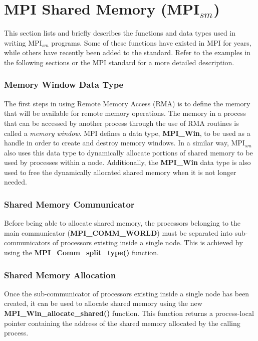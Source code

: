 \section{MPI Shared Memory (MPI$_{sm}$)}

This section lists and briefly describes the functions and data types used in writing MPI$_{sm}$ programs. Some of these functions have existed in MPI for years, while others have recently been added to the standard. Refer to the examples in the following sections or the MPI standard for a more detailed description.

\subsubsection*{Memory Window Data Type}

The first steps in using Remote Memory Access (RMA) is to define the memory that will be available for remote memory operations. The memory in a process that can be accessed by another process through the use of RMA routines is called a \emph{memory window}. MPI defines a data type, \textbf{MPI\_Win}, to be used as a handle in order to create and destroy memory windows. In a similar way, MPI$_{sm}$ also uses this data type to dynamically allocate portions of shared memory to be used by processes within a node. Additionally, the \textbf{MPI\_Win} data type is also used to free the dynamically allocated shared memory when it is not longer needed.


\subsubsection*{Shared Memory Communicator}

Before being able to allocate shared memory, the processors belonging to the main communicator (\textbf{MPI\_COMM\_WORLD}) must be separated into sub-communicators of processors existing inside a single node. This is achieved by using the \textbf{MPI\_Comm\_split\_type()} function.

\subsubsection*{Shared Memory Allocation}

Once the sub-communicator of processors existing inside a single node has been created, it can be used to allocate shared memory using the new \textbf{MPI\_Win\_allocate\_shared()} function. This function returns a process-local pointer containing the address of the shared memory allocated by the calling process.

